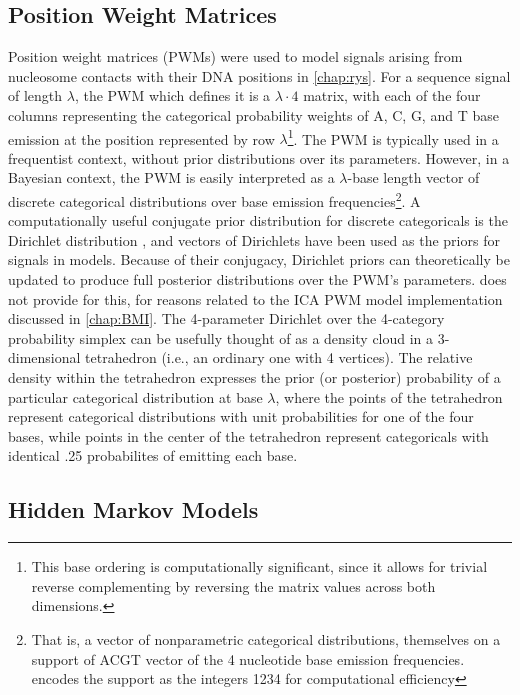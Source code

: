 \subsection{Position Weight Matrices}
\label{ssec:PWM}
Position weight matrices (PWMs) were used to model signals arising from nucleosome contacts with their DNA positions in \autoref{chap:rys}. For a sequence signal of length $\lambda$, the PWM which defines it is a $\lambda \cdot 4$ matrix, with each of the four columns representing the categorical probability weights of A, C, G, and T base emission at the position represented by row $\lambda$\footnote{This base ordering is computationally significant, since it allows for trivial reverse complementing by reversing the matrix values across both dimensions.}. The PWM is typically used in a frequentist context, without prior distributions over its parameters. However, in a Bayesian context, the PWM is easily interpreted as a $\lambda$-base length vector of discrete categorical distributions over base emission frequencies\footnote{That is, a vector of nonparametric categorical distributions, themselves on a support of ACGT vector of the 4 nucleotide base emission frequencies.  encodes the support as the integers 1234 for computational efficiency}. A computationally useful conjugate prior distribution for discrete categoricals is the Dirichlet distribution \cite{Minka2000}, and vectors of Dirichlets have been used as the priors for signals in  models. Because of their conjugacy, Dirichlet priors can theoretically be updated to produce full posterior distributions over the PWM's parameters.  does not provide for this, for reasons related to the ICA PWM model implementation discussed in \autoref{chap:BMI}. The 4-parameter Dirichlet over the 4-category probability simplex can be usefully thought of as a density cloud in a 3-dimensional tetrahedron (i.e., an ordinary one with 4 vertices). The relative density within the tetrahedron expresses the prior (or posterior) probability of a particular categorical distribution at base $\lambda$, where the points of the tetrahedron represent categorical distributions with unit probabilities for one of the four bases, while points in the center of the tetrahedron represent categoricals with identical .25 probabilites of emitting each base. 

\subsection{Hidden Markov Models}
\label{ssec:HMM}


